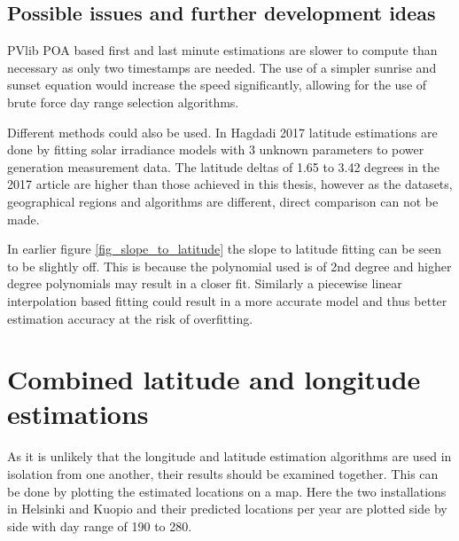 \subsection{Possible issues and further development ideas}
PVlib POA based first and last minute estimations are slower to compute than necessary as only two timestamps are needed. The use of a simpler sunrise and sunset equation would increase the speed significantly, allowing for the use of brute force day range selection algorithms.

Different methods could also be used. In Hagdadi 2017 \cite{navid_australian_article} latitude estimations are done by fitting solar irradiance models with 3 unknown parameters to power generation measurement data. The latitude deltas of 1.65 to 3.42 degrees in the 2017 article are higher than those achieved in this thesis, however as the datasets, geographical regions and algorithms are different, direct comparison can not be made.


In earlier figure \ref{fig_slope_to_latitude} the slope to latitude fitting can be seen to be slightly off. This is because the polynomial used is of 2nd degree and higher degree polynomials may result in a closer fit. Similarly a piecewise linear interpolation based fitting could result in a more accurate model and thus better estimation accuracy at the risk of overfitting. 


\newpage
\section{Combined latitude and longitude estimations}
As it is unlikely that the longitude and latitude estimation algorithms are used in isolation from one another, their results should be examined together. This can be done by plotting the estimated locations on a map. Here the two installations in Helsinki and Kuopio and their predicted locations per year are plotted side by side with day range of 190 to 280.

